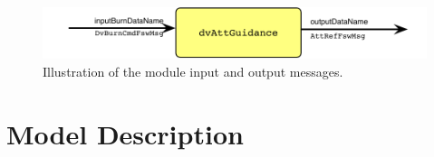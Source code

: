 

\begin{figure}[h]
	\centerline{
		\includegraphics{Figures/moduleImg}
	}
	\caption{Illustration of the module input and output messages.}
	\label{fig:moduleImg}
\end{figure}


\section{Model Description}

